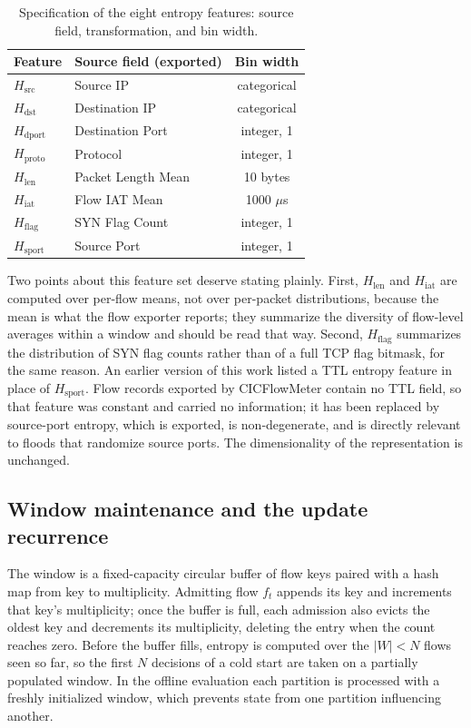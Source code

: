 \documentclass{ieeeaccess}
\begin{document}
\begin{table}[!t]
\caption{Specification of the eight entropy features: source field, transformation, and bin width.}
\centering
\label{tab:featurespec}
\footnotesize
\setlength{\tabcolsep}{3pt}
\renewcommand{\arraystretch}{1.2}
\begin{tabular}{@{}llc@{}}
\toprule
\textbf{Feature} & \textbf{Source field (exported)} & \textbf{Bin width} \\
\midrule
$H_{\mathrm{src}}$      & Source IP                & categorical \\
$H_{\mathrm{dst}}$      & Destination IP           & categorical \\
$H_{\mathrm{dport}}$    & Destination Port         & integer, 1 \\
$H_{\mathrm{proto}}$    & Protocol                 & integer, 1 \\
$H_{\mathrm{len}}$      & Packet Length Mean       & 10 bytes \\
$H_{\mathrm{iat}}$      & Flow IAT Mean            & 1000 $\mu$s \\
$H_{\mathrm{flag}}$     & SYN Flag Count           & integer, 1 \\
$H_{\mathrm{sport}}$    & Source Port              & integer, 1 \\
\bottomrule
\end{tabular}
\end{table}

Two points about this feature set deserve stating plainly. First, $H_{\mathrm{len}}$ and $H_{\mathrm{iat}}$ are computed over per-flow means, not over per-packet distributions, because the mean is what the flow exporter reports; they summarize the diversity of flow-level averages within a window and should be read that way. Second, $H_{\mathrm{flag}}$ summarizes the distribution of SYN flag counts rather than of a full TCP flag bitmask, for the same reason. An earlier version of this work listed a TTL entropy feature in place of $H_{\mathrm{sport}}$. Flow records exported by CICFlowMeter contain no TTL field, so that feature was constant and carried no information; it has been replaced by source-port entropy, which is exported, is non-degenerate, and is directly relevant to floods that randomize source ports. The dimensionality of the representation is unchanged.

\subsection{Window maintenance and the update recurrence}
\label{sec:rolling}
The window is a fixed-capacity circular buffer of flow keys paired with a hash map from key to multiplicity. Admitting flow $f_t$ appends its key and increments that key's multiplicity; once the buffer is full, each admission also evicts the oldest key and decrements its multiplicity, deleting the entry when the count reaches zero. Before the buffer fills, entropy is computed over the $|W| < N$ flows seen so far, so the first $N$ decisions of a cold start are taken on a partially populated window. In the offline evaluation each partition is processed with a freshly initialized window, which prevents state from one partition influencing another.
\end{document}
